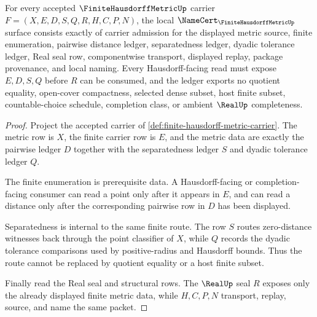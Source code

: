 \begin{theorem}
\label{thm:finite-hausdorff-metric-namecert-obligations}
For every accepted $\FiniteHausdorffMetricUp$ carrier $F=(X,E,D,S,Q,R,H,C,P,N)$, the local $\NameCert_{\FiniteHausdorffMetricUp}$ surface consists exactly of carrier admission for the displayed metric source, finite enumeration, pairwise distance ledger, separatedness ledger, dyadic tolerance ledger, Real seal row, componentwise transport, displayed replay, package provenance, and local naming. Every Hausdorff-facing read must expose $E,D,S,Q$ before $R$ can be consumed, and the ledger exports no quotient equality, open-cover compactness, selected dense subset, host finite subset, countable-choice schedule, completion class, or ambient $\RealUp$ completeness.
\end{theorem}
\begin{proof}
Project the accepted carrier of \autoref{def:finite-hausdorff-metric-carrier}. The metric row is $X$, the finite carrier row is $E$, and the metric data are exactly the pairwise ledger $D$ together with the separatedness ledger $S$ and dyadic tolerance ledger $Q$.

The finite enumeration is prerequisite data. A Hausdorff-facing or completion-facing consumer can read a point only after it appears in $E$, and can read a distance only after the corresponding pairwise row in $D$ has been displayed.

Separatedness is internal to the same finite route. The row $S$ routes zero-distance witnesses back through the point classifier of $X$, while $Q$ records the dyadic tolerance comparisons used by positive-radius and Hausdorff bounds. Thus the route cannot be replaced by quotient equality or a host finite subset.

Finally read the Real seal and structural rows. The $\RealUp$ seal $R$ exposes only the already displayed finite metric data, while $H,C,P,N$ transport, replay, source, and name the same packet.
\end{proof}

